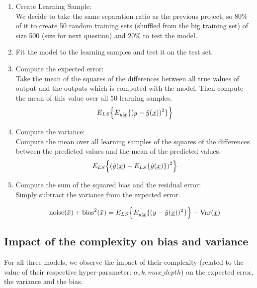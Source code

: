 \documentclass[12pt,titlepage]{article}
\begin{document}
\begin{enumerate}
    \item 
    Create Learning Sample: \\ 
    We decide to take the same separation ratio as the previous project, so 80\% of it to create 50 random training sets (shuffled from the big training set) of size 500 (size for next question) and 20\% to test the model.

    \item 
    Fit the model to the learning samples and test it on the test set.

    \item 
    Compute the expected error: \\
    Take the mean of the squares of the differences between all true values of output and the outputs which is computed with the model. Then compute the mean of this value over all 50 learning samples.
    \[ 
    E_{LS}\Bigl\{ 
    E_{y \mid \underline{x}} 
    \{ (y - \hat{y}(\underline{x}))^{2} \} 
    \Bigr\} 
    \]

    \item 
    Compute the variance: \\
    Compute the mean over all learning samples of the squares of the differences between the predicted values and the mean of the predicted values.
    \[ 
    E_{LS}\Bigl\{ 
    \left(
    \hat{y}(\underline{x}) - E_{LS} \{ \hat{y}(\underline{x}) \}
    \right)^{2} 
    \Bigr\} 
    \]

    \item 
    Compute the sum of the squared bias and the residual error: \\
    Simply subtract the variance from the expected error.

    \[
    \text{noise}(\bar{x}) + \text{bias}^2(\bar{x}) = 
    E_{LS}
    \Bigl\{ 
    E_{y \mid \underline{x}} 
    \{ (y - \hat{y}(\underline{x}))^{2} \} 
    \Bigr\}  -
    \text{Var}(\underline{x})
    \]
    
\end{enumerate}

\subsection{Impact of the complexity on bias and variance}
For all three models, we observe the impact of their complexity (related to the value of their respective hyper-parameter: $\alpha, k, max\_depth$) on the expected error, the variance and the bias. 
\end{document}
